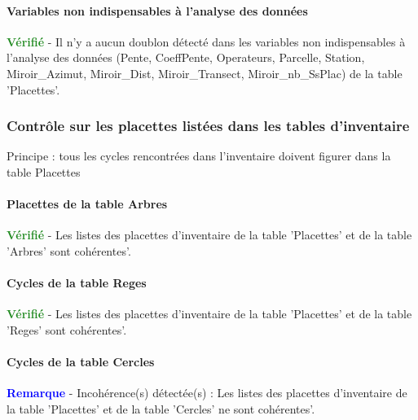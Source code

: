 \documentclass[a4paper]{article}
\begin{document}
\paragraph{Variables non indispensables à l'analyse des données}
\textcolor{ForestGreen}{\textbf{Vérifié}} - Il n'y a aucun doublon détecté dans les variables non indispensables à l'analyse des données (Pente, CoeffPente, Operateurs, Parcelle, Station, Miroir\_Azimut, Miroir\_Dist, Miroir\_Transect, Miroir\_nb\_SsPlac) de la table 'Placettes'. \\ 

\subsubsection{Contrôle sur les placettes listées dans les tables d'inventaire}
Principe : tous les cycles rencontrées dans l'inventaire doivent figurer dans la table Placettes\\ 
\paragraph{Placettes de la table Arbres}
\textcolor{ForestGreen}{\textbf{Vérifié}} - Les listes des placettes d'inventaire de la table 'Placettes' et de la table 'Arbres' sont cohérentes'. \\ 

\paragraph{Cycles de la table Reges}
\textcolor{ForestGreen}{\textbf{Vérifié}} - Les listes des placettes d'inventaire de la table 'Placettes' et de la table 'Reges' sont cohérentes'. \\ 

\paragraph{Cycles de la table Cercles}
\textcolor{blue}{\textbf{Remarque}} - Incohérence(s) détectée(s) : Les listes des placettes d'inventaire de la table 'Placettes' et de la table 'Cercles' ne sont cohérentes'. \\ 
\end{document}
